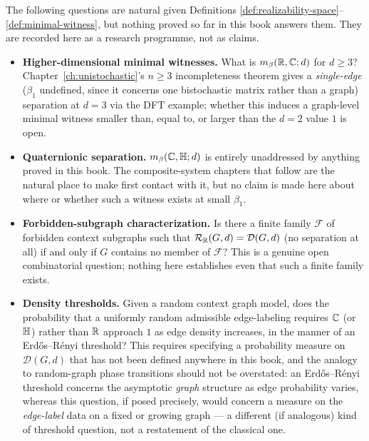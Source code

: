 The following questions are natural given Definitions
\ref{def:realizability-space}--\ref{def:minimal-witness}, but nothing proved
so far in this book answers them. They are recorded here as a research
programme, not as claims.

\begin{itemize}
\item[] \textbf{Higher-dimensional minimal witnesses.} What is
$m_\beta(\mathbb{R},\mathbb{C};d)$ for $d \ge 3$? Chapter~\ref{ch:unistochastic}'s $n\ge3$
incompleteness theorem gives a \emph{single-edge} ($\beta_1$ undefined,
since it concerns one bistochastic matrix rather than a graph) separation at
$d=3$ via the DFT example; whether this induces a graph-level minimal witness
smaller than, equal to, or larger than the $d=2$ value $1$ is open.

\item[] \textbf{Quaternionic separation.} $m_\beta(\mathbb{C},\mathbb{H};d)$ is entirely
unaddressed by anything proved in this book. The composite-system chapters
that follow are the natural place to make first contact with it, but no claim
is made here about where or whether such a witness exists at small $\beta_1$.

\item[] \textbf{Forbidden-subgraph characterization.} Is there a finite family
$\mathcal F$ of forbidden context subgraphs such that $\mathcal R_{\mathbb{R}}(G,d) =
\mathcal D(G,d)$ (no separation at all) if and only if $G$ contains no member
of $\mathcal F$? This is a genuine open combinatorial question; nothing here
establishes even that such a finite family exists.

\item[] \textbf{Density thresholds.} Given a random context graph model, does
the probability that a uniformly random admissible edge-labeling requires
$\mathbb{C}$ (or $\mathbb{H}$) rather than $\mathbb{R}$ approach $1$ as edge density increases,
in the manner of an Erd\H{o}s--R\'enyi threshold? This requires specifying a
probability measure on $\mathcal D(G,d)$ that has not been defined anywhere in
this book, and the analogy to random-graph phase transitions should not be
overstated: an Erd\H{o}s--R\'enyi threshold concerns the asymptotic
\emph{graph} structure as edge probability varies, whereas this question, if
posed precisely, would concern a measure on the \emph{edge-label} data on a
fixed or growing graph — a different (if analogous) kind of threshold
question, not a restatement of the classical one.
\end{itemize}

